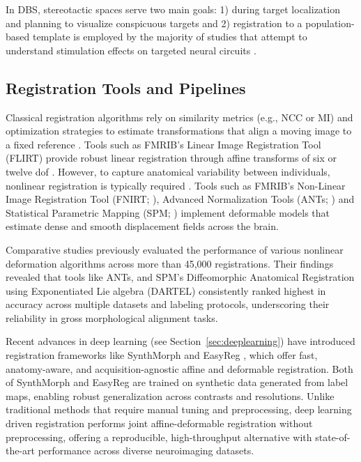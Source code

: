 In DBS, stereotactic spaces serve two main goals: 1) during target localization and planning to visualize conspicuous targets \cite{Stancanello2006-vj} and 2) registration to a population-based template is employed by the majority of studies that attempt to understand stimulation effects on targeted neural circuits \cite{Neudorfer2023-wd}.

\subsection{Registration Tools and Pipelines}
Classical registration algorithms rely on similarity metrics (e.g., NCC or MI) and optimization strategies to estimate transformations that align a moving image to a fixed reference \cite{Hoffmann2024-yd}. Tools such as FMRIB's Linear Image Registration Tool (FLIRT) provide robust linear registration through affine transforms of six or twelve dof \cite{Jenkinson2001-bw, Jenkinson2002-ab}. However, to capture anatomical variability between individuals, nonlinear registration is typically required \cite{Klein2009-lv}. Tools such as FMRIB's Non-Linear Image Registration Tool (FNIRT; \cite{Jenkinson2001-bw}), Advanced Normalization Tools (ANTs; \cite{Avants2011-zs}) and Statistical Parametric Mapping (SPM; \cite{Ashburner2007-en}) implement deformable models that estimate dense and smooth displacement fields across the brain.

Comparative studies \cite{Klein2009-lv, Ewert2019-cc} previously evaluated the performance of various nonlinear deformation algorithms across more than 45,000 registrations. Their findings revealed that tools like ANTs, and SPM's Diffeomorphic Anatomical Registration using Exponentiated Lie algebra (DARTEL) consistently ranked highest in accuracy across multiple datasets and labeling protocols, underscoring their reliability in gross morphological alignment tasks.

Recent advances in deep learning (see Section~\ref{sec:deeplearning}) have introduced registration frameworks like SynthMorph \cite{Hoffmann2024-yd} and EasyReg \cite{Iglesias2023-ni}, which offer fast, anatomy-aware, and acquisition-agnostic affine and deformable registration. Both of SynthMorph and EasyReg are trained on synthetic data generated from label maps, enabling robust generalization across contrasts and resolutions. Unlike traditional methods that require manual tuning and preprocessing, deep learning driven registration performs joint affine-deformable registration without preprocessing, offering a reproducible, high-throughput alternative with state-of-the-art performance across diverse neuroimaging datasets. 

